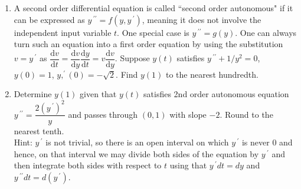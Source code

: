 \documentclass{ximera}
\begin{document}
\begin{enumerate}[label=(\arabic*)]



\newpage

\item A second order differential equation is called ``second order autonomous" if it can be expressed as $y\,^{\prime\prime}=f(y,y\,^{\prime})$, meaning it does not involve the independent input variable $t$.  One special case is $y\,^{\prime\prime}=g(y)$.  One can always turn such an equation into a first order equation by using the substitution $v=y\,^{\prime}$ as $\displaystyle \dfrac{\mathrm{d}v}{\mathrm{d}t}=\dfrac{\mathrm{d}v}{\mathrm{d}y}\dfrac{\mathrm{d}y}{\mathrm{d}t}=v\dfrac{\mathrm{d}v}{\mathrm{d}y}$.  Suppose $y(t)$ satisfies $y\,^{\prime\prime}+1/y^2=0$, $y(0)=1$, $y,^{\prime}(0)=-\sqrt{2}$. Find $y(1)$ to the nearest hundredth. 











\item Determine $y(1)$ given that $y(t)$ satisfies 2nd order autonomous equation $y\,^{\prime\prime}=\dfrac{2(y\,^{\prime})^{2}}{y}$ and passes through $(0,1)$ with slope $-2$.  Round to the nearest tenth. \\

Hint: $y\,^{\prime}$ is not trivial, so there is an open interval on which $y\,^{\prime}$ is never $0$ and hence, on that interval we may divide both sides of the equation by $y\,^{\prime}$ and then integrate both sides with respect to $t$ using that $y\,^{\prime}dt=dy$ and $y\,^{\prime\prime}dt=d(y\,^{\prime})$.\\





\end{enumerate}
\end{document}
